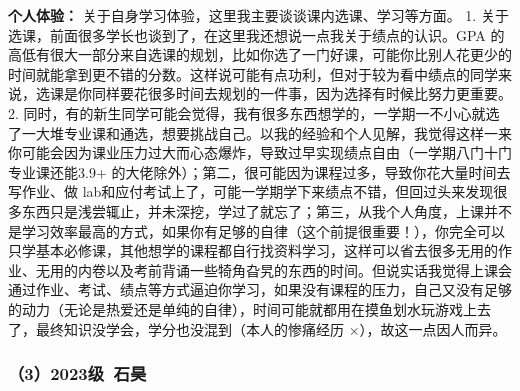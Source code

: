 \documentclass[11pt,oneside]{book}
\begin{document}
\textbf{个人体验：}
关于自身学习体验，这里我主要谈谈课内选课、学习等方面。
	1. 关于选课，前面很多学长也谈到了，在这里我还想说一点我关于绩点的认识。GPA 的高低有很大一部分来自选课的规划，比如你选了一门好课，可能你比别人花更少的时间就能拿到更不错的分数。这样说可能有点功利，但对于较为看中绩点的同学来说，选课是你同样要花很多时间去规划的一件事，因为选择有时候比努力更重要。
	2. 同时，有的新生同学可能会觉得，我有很多东西想学的，一学期一不小心就选了一大堆专业课和通选，想要挑战自己。以我的经验和个人见解，我觉得这样一来你可能会因为课业压力过大而心态爆炸，导致过早实现绩点自由（一学期八门十门专业课还能3.9+ 的大佬除外）；第二，很可能因为课程过多，导致你花大量时间去写作业、做 lab和应付考试上了，可能一学期学下来绩点不错，但回过头来发现很多东西只是浅尝辄止，并未深挖，学过了就忘了；第三，从我个人角度，上课并不是学习效率最高的方式，如果你有足够的自律（这个前提很重要！），你完全可以只学基本必修课，其他想学的课程都自行找资料学习，这样可以省去很多无用的作业、无用的内卷以及考前背诵一些犄角旮旯的东西的时间。但说实话我觉得上课会通过作业、考试、绩点等方式逼迫你学习，如果没有课程的压力，自己又没有足够的动力（无论是热爱还是单纯的自律），时间可能就都用在摸鱼划水玩游戏上去了，最终知识没学会，学分也没混到（本人的惨痛经历 ×），故这一点因人而异。

\subsubsection{（3）2023级\ 石昊}
\end{document}

